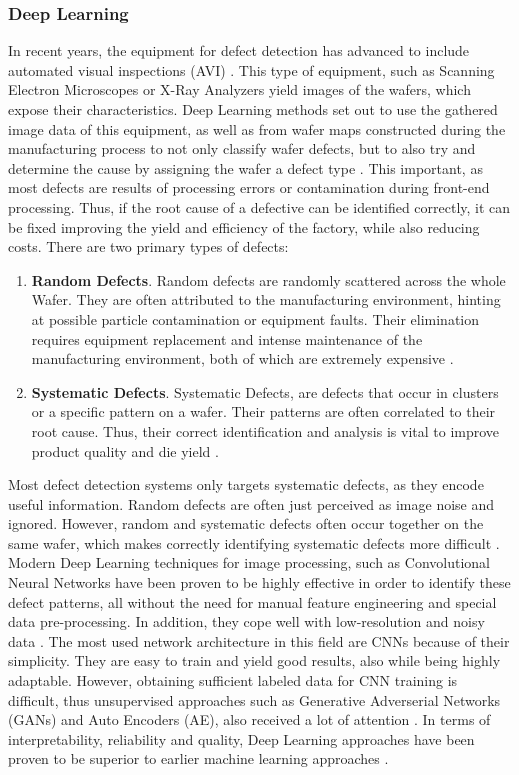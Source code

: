 \documentclass{Academic}
\begin{document}
    \subsubsection{Deep Learning}
    In recent years, the equipment for defect detection has advanced to include automated visual inspections (AVI) \cite{batool_systematic_2021}. This type of equipment, such as Scanning Electron Microscopes or X-Ray Analyzers yield images of the wafers, which expose their characteristics. Deep Learning methods set out to use the gathered image data of this equipment, as well as from wafer maps constructed during the manufacturing process to not only classify wafer defects, but to also try and determine the cause by assigning the wafer a defect type \cite{batool_systematic_2021,yuan-fu_deep_2019-1}. This important, as most defects are results of processing errors or contamination during front-end processing. Thus, if the root cause of a defective can be identified correctly, it can be fixed improving the yield and efficiency of the factory, while also reducing costs. There are two primary types of defects:
    \begin{enumerate}
        \item \textbf{Random Defects}. Random defects are randomly scattered across the whole Wafer. They are often attributed to the manufacturing environment, hinting at possible particle contamination or equipment faults. Their elimination requires equipment replacement and intense maintenance of the manufacturing environment, both of which are extremely expensive \cite{batool_systematic_2021}.
        \item \textbf{Systematic Defects}. Systematic Defects, are defects that occur in clusters or a specific pattern on a wafer. Their patterns are often correlated to their root cause. Thus, their correct identification and analysis is vital to improve product quality and die yield \cite{batool_systematic_2021}.
    \end{enumerate}
    Most defect detection systems only targets systematic defects, as they encode useful information. Random defects are often just perceived as image noise and ignored. However, random and systematic defects often occur together on the same wafer, which makes correctly identifying systematic defects more difficult \cite{batool_systematic_2021}. Modern Deep Learning techniques for image processing, such as Convolutional Neural Networks have been proven to be highly effective in order to identify these defect patterns, all without the need for manual feature engineering and special data pre-processing. In addition, they cope well with low-resolution and noisy data \cite{batool_systematic_2021}. The most used network architecture in this field are CNNs because of their simplicity. They are easy to train and yield good results, also while being highly adaptable. However, obtaining sufficient labeled data for CNN training is difficult, thus unsupervised approaches such as Generative Adverserial Networks (GANs) and Auto Encoders (AE), also received a lot of attention \cite{batool_systematic_2021}. In terms of interpretability, reliability and quality, Deep Learning approaches have been proven to be superior to earlier machine learning approaches \cite{batool_systematic_2021}.
\end{document}
